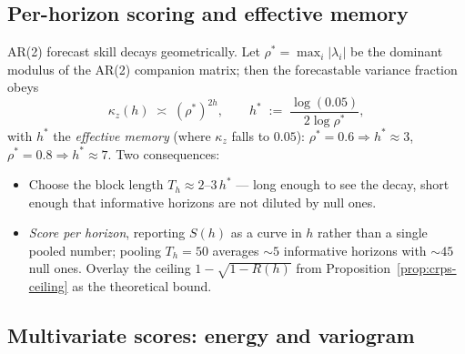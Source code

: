 \documentclass[11pt]{article}
\theoremstyle{definition}
\begin{document}
\subsection{Per-horizon scoring and effective memory}
\label{subsec:per-horizon}

AR(2) forecast skill decays geometrically. Let $\rho^\ast =
\max_i|\lambda_i|$ be the dominant modulus of the AR(2) companion
matrix; then the forecastable variance fraction obeys
\begin{equation}
  \kappa_z(h) \;\asymp\; (\rho^\ast)^{2h},
  \qquad
  h^\ast \;:=\; \frac{\log(0.05)}{2\log\rho^\ast},
  \label{eq:effective-memory}
\end{equation}
with $h^\ast$ the \emph{effective memory} (where $\kappa_z$ falls to
$0.05$): $\rho^\ast=0.6\Rightarrow h^\ast\approx3$,
$\rho^\ast=0.8\Rightarrow h^\ast\approx7$. Two consequences:
\begin{itemize}[leftmargin=1.6em, itemsep=2pt]
  \item Choose the block length $T_h\approx2\text{--}3\,h^\ast$ --- long
        enough to see the decay, short enough that informative horizons
        are not diluted by null ones.
  \item \emph{Score per horizon}, reporting $S(h)$ as a curve in $h$
        rather than a single pooled number; pooling
        $T_h=50$ averages $\sim5$ informative horizons with $\sim45$
        null ones. Overlay the ceiling $1-\sqrt{1-R(h)}$ from
        Proposition~\ref{prop:crps-ceiling} as the theoretical bound.
\end{itemize}

\subsection{Multivariate scores: energy and variogram}
\label{subsec:multivariate}
\end{document}
